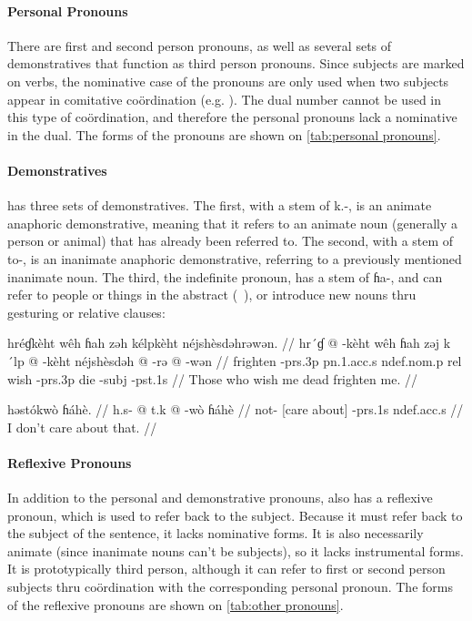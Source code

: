 \paragraph{Personal Pronouns} There are first and second person pronouns, as
well as several sets of demonstratives that function as third person pronouns.
Since subjects are marked on verbs, the nominative case of the pronouns are
only used when two subjects appear in comitative coördination (e.g. ). The dual number cannot be used in this type of coördination,
and therefore the personal pronouns lack a nominative in the dual. The forms of
the pronouns are shown on \cref{tab:personal pronouns}.

\paragraph{Demonstratives} \Langname{} has three sets of demonstratives. The
first, with a stem of {\ll k.-}, is an animate anaphoric demonstrative, meaning
that it refers to an animate noun (generally a person or animal) that has
already been referred to. The second, with a stem of {\ll to-}, is an
inanimate anaphoric demonstrative, referring to a previously mentioned
inanimate noun. The third, the indefinite pronoun, has a stem of {\ll ɦa-}, and
can refer to people or things in the abstract (\ie\ ), or introduce
new nouns thru gesturing or relative clauses:

\pex
\a
\begingl
\glpreamble hréɠkèht wêh ɦah zəh kélpkèht néjshèsdəhrəwən. //
\gla hr´ɠ @ -kèht wêh ɦah zəj k´lp @ -kèht néjshèsdəh @ -rə @
-wən //
\glb frighten -{\sc prs}.3p {\sc pn}.1.{\sc acc}.s {\sc ndef}.{\sc nom}.p {\sc
    rel} wish -{\sc prs}.3p die -{\sc subj} -{\sc pst}.1s //
\glft Those who wish me dead frighten me. //
\endgl

\a
\begingl
    \glpreamble həstókwò ɦáhè. //
    \gla h.s- @ t.k @ -wò ɦáhè //
    \glb not- {[care about]} -{\sc prs}.1s {\sc ndef}.{\sc acc}.s //
    \glft I don't care about that. //
\endgl
\xe

\paragraph{Reflexive Pronouns} In addition to the personal and demonstrative
pronouns, \Langname{} also has a reflexive pronoun, which is used to
refer back to the subject. Because it must refer back to the subject of the
sentence, it lacks nominative forms. It is also necessarily animate (since
inanimate nouns can't be subjects), so it lacks instrumental forms. It is
prototypically third person, although it can refer to first or second person
subjects thru coördination with the corresponding personal pronoun. The forms
of the reflexive pronouns are shown on \cref{tab:other pronouns}.

